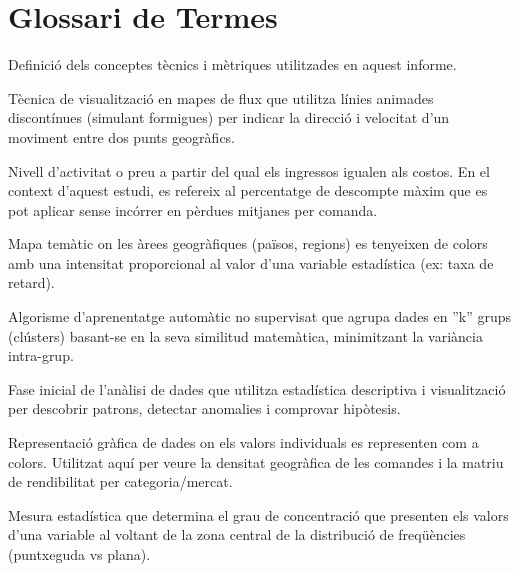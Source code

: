 \documentclass[12pt,a4paper]{article}
\begin{document}
\section{Glossari de Termes}
\label{app:glossary}

Definició dels conceptes tècnics i mètriques utilitzades en aquest informe.

\begin{description}[leftmargin=3cm, style=nextline]
    
    \item[AntPath]
    Tècnica de visualització en mapes de flux que utilitza línies animades discontínues (simulant formigues) per indicar la direcció i velocitat d'un moviment entre dos punts geogràfics.
    
    \item[Break-even Point (Punt Mort)]
    Nivell d'activitat o preu a partir del qual els ingressos igualen als costos. En el context d'aquest estudi, es refereix al percentatge de descompte màxim que es pot aplicar sense incórrer en pèrdues mitjanes per comanda.
    
    \item[Choropleth Map]
    Mapa temàtic on les àrees geogràfiques (països, regions) es tenyeixen de colors amb una intensitat proporcional al valor d'una variable estadística (ex: taxa de retard).
    
    \item[Clustering (K-Means)]
    Algorisme d'aprenentatge automàtic no supervisat que agrupa dades en ''k'' grups (clústers) basant-se en la seva similitud matemàtica, minimitzant la variància intra-grup.
    
    \item[EDA (Exploratory Data Analysis)]
    Fase inicial de l'anàlisi de dades que utilitza estadística descriptiva i visualització per descobrir patrons, detectar anomalies i comprovar hipòtesis.
    
    \item[Heatmap (Mapa de Calor)]
    Representació gràfica de dades on els valors individuals es representen com a colors. Utilitzat aquí per veure la densitat geogràfica de les comandes i la matriu de rendibilitat per categoria/mercat.
    
    \item[Kurtosis (Curtosi)]
    Mesura estadística que determina el grau de concentració que presenten els valors d'una variable al voltant de la zona central de la distribució de freqüències (puntxeguda vs plana).
    

\end{description}
\end{document}
